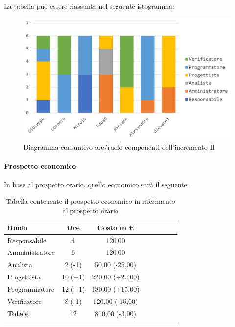			La tabella può essere riassunta nel seguente istogramma:
			
			\begin{figure}[H]
				\centering
				\includegraphics[width=0.8\linewidth]{images/consuntivo/ConsIncr2-1.png}
				\caption{Diagramma consuntivo ore/ruolo componenti dell'incremento II}
				\label{fig:consuntivo diagramma suddivione ruoli incremento II}
			\end{figure}
			
		\paragraph{Prospetto economico}
			In base al prospetto orario, quello economico sarà il seguente: 
			
			\begin{longtable}{|l|c|c|c|c|c|c|c|}
				\hline
				\rowcolor{lighter-grayer}
				\textbf{Ruolo} & \textbf{Ore} & \textbf{Costo in €} \\
				\hline
				\endfirsthead
				\hline
			Responsabile 	    & 4 & 120,00\\
			\hline 
			\hline
			Amministratore	  & 6 & 120,00\\
			\hline
			\hline
			Analista 				& 2 (-1) & 50,00 (-25,00) \\
			\hline
			\hline
			Progettista 		  & 10 (+1) & 220,00 (+22,00)\\
			\hline
			\hline
			Programmatore 	 & 12 (+1) & 180,00 (+15,00)\\
			\hline
			\hline
			Verificatore 		  & 8 (-1) & 120,00 (-15,00) \\
			\hline
			\textbf{Totale} 	& 42 & 810,00 (-3,00) \\
			\hline
				
				\caption{Tabella contenente il prospetto economico in riferimento al prospetto orario}
			\end{longtable}
		\pagebreak
			

